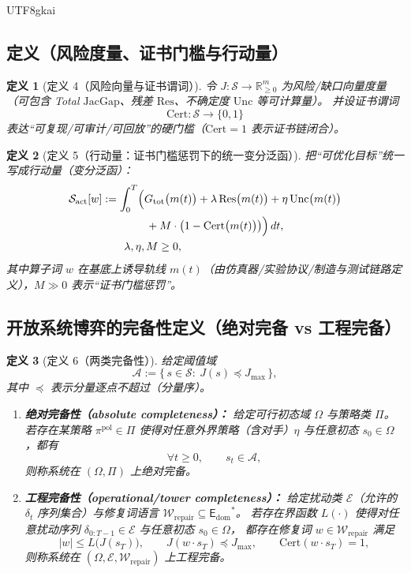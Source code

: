 \documentclass[12pt]{article}
\newtheorem{definition}{定义}[section]
\newcommand{\RR}{\ensuremath{\mathbb{R}}}
\newcommand{\JacGap}{\ensuremath{\mathrm{JacGap}}}
\newcommand{\EDOM}{\ensuremath{\mathsf{E}_{\mathrm{dom}}}}
\newcommand{\Res}{\ensuremath{\mathrm{Res}}}
\newcommand{\Unc}{\ensuremath{\mathrm{Unc}}}
\newcommand{\Cert}{\ensuremath{\mathrm{Cert}}}
\begin{document}
\begin{CJK*}{UTF8}{gkai}
\subsection{定义（风险度量、证书门槛与行动量）}
\label{subsec:tex25-def-risk-cert-action}

\begin{definition}[定义 4（风险向量与证书谓词）]
令 $J:\mathcal{S}\to\RR_{\ge 0}^{m}$ 为风险/缺口向量度量（可包含 Total \JacGap{}、残差 $\Res$、不确定度 $\Unc$ 等可计算量）。
并设证书谓词
\[
  \Cert:\mathcal{S}\to\{0,1\}
\]
表达“可复现/可审计/可回放”的硬门槛（$\Cert=1$ 表示证书链闭合）。
\end{definition}

\begin{definition}[定义 5（行动量：证书门槛惩罚下的统一变分泛函）]
把“可优化目标”统一写成行动量（变分泛函）：
\[
  \begin{aligned}
    \mathcal{S}_{\mathrm{act}}[w]
    &:=
    \int_{0}^{T}\Bigl(
      G_{\mathrm{tot}}\bigl(m(t)\bigr)
      +\lambda\,\Res\bigl(m(t)\bigr)
      +\eta\,\Unc\bigl(m(t)\bigr)
      \\
      &\qquad\qquad
      +M\cdot\bigl(1-\Cert\bigl(m(t)\bigr)\bigr)
    \Bigr)\,dt,
    \\
    &\qquad
    \lambda,\eta,M\ge 0,
  \end{aligned}
\]
其中算子词 $w$ 在基底上诱导轨线 $m(t)$（由仿真器/实验协议/制造与测试链路定义），$M\gg 0$ 表示“证书门槛惩罚”。
\end{definition}

\subsection{开放系统博弈的完备性定义（绝对完备 vs 工程完备）}
\label{subsec:tex25-def-completeness}

\begin{definition}[定义 6（两类完备性）]
给定阈值域
\[
  \mathcal{A}:=\{\,s\in\mathcal{S}:\ J(s)\preceq J_{\max}\,\},
\]
其中 $\preceq$ 表示分量逐点不超过（分量序）。
\begin{enumerate}
  \item \textbf{绝对完备性（absolute completeness）：}
  给定可行初态域 $\Omega$ 与策略类 $\Pi$。
  若存在某策略 $\pi^{\mathrm{pol}}\in\Pi$ 使得对任意外界策略（含对手）$\eta$ 与任意初态 $s_0\in\Omega$，都有
  \[
    \forall t\ge 0,\qquad s_t\in\mathcal{A},
  \]
  则称系统在 $(\Omega,\Pi)$ 上绝对完备。
  \item \textbf{工程完备性（operational/tower completeness）：}
  给定扰动类 $\mathcal{E}$（允许的 $\delta_t$ 序列集合）与修复词语言 $\mathcal{W}_{\mathrm{repair}}\subseteq\EDOM^{\ast}$。
  若存在界函数 $L(\cdot)$ 使得对任意扰动序列 $\delta_{0:T-1}\in\mathcal{E}$ 与任意初态 $s_0\in\Omega$，
  都存在修复词 $w\in\mathcal{W}_{\mathrm{repair}}$ 满足
  \[
    |w|\le L\bigl(J(s_T)\bigr),\qquad
    J(w\cdot s_T)\preceq J_{\max},\qquad
    \Cert(w\cdot s_T)=1,
  \]
  则称系统在 $(\Omega,\mathcal{E},\mathcal{W}_{\mathrm{repair}})$ 上工程完备。
\end{enumerate}
\end{definition}


\end{CJK*}
\end{document}
